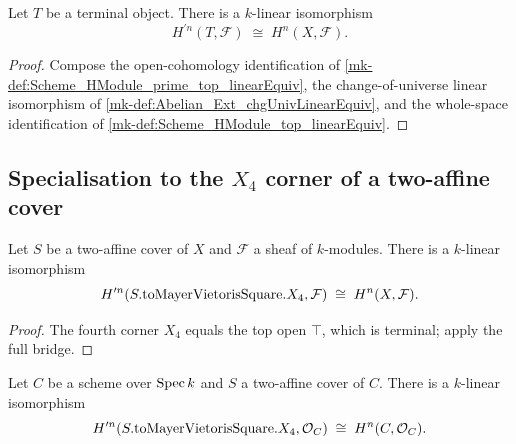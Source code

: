 \begin{definition}\label{mk-def:Scheme_HModule_prime_eq_HModule_linearEquiv}
  \leanok


  Let \(T\) be a terminal object. There is a \(k\)-linear isomorphism
  \[
    H^{\prime n}(T, \mathcal F) \;\cong\; H^{n}(X, \mathcal F).
  \]
\end{definition}

\begin{proof}
  \leanok


Compose the open-cohomology identification of \ref{mk-def:Scheme_HModule_prime_top_linearEquiv}, the change-of-universe linear isomorphism of \ref{mk-def:Abelian_Ext_chgUnivLinearEquiv}, and the whole-space identification of \ref{mk-def:Scheme_HModule_top_linearEquiv}.
\end{proof}

\subsection{Specialisation to the \(X_4\) corner of a two-affine cover}

\begin{definition}\label{mk-def:Scheme_AffineCoverMVSquare_HModule_prime_X4_linearEquiv}
  \leanok


  Let \(S\) be a two-affine cover of \(X\) and \(\mathcal F\) a sheaf of \(k\)-modules. There is a \(k\)-linear isomorphism
  \[
    H^{\prime n}(S.\mathrm{toMayerVietorisSquare}.X_4, \mathcal F) \;\cong\; H^{n}(X, \mathcal F).
  \]
\end{definition}

\begin{proof}
  \leanok


The fourth corner \(X_4\) equals the top open \(\top\), which is terminal; apply the full bridge.
\end{proof}

\begin{definition}\label{mk-def:Scheme_AffineCoverMVSquare_HModule_prime_X4_linearEquiv_curve}
  \leanok


  Let \(C\) be a scheme over \(\operatorname{Spec} k\) and \(S\) a two-affine cover of \(C\). There is a \(k\)-linear isomorphism
  \[
    H^{\prime n}(S.\mathrm{toMayerVietorisSquare}.X_4, \mathcal O_C) \;\cong\; H^{n}(C, \mathcal O_C).
  \]
\end{definition}

